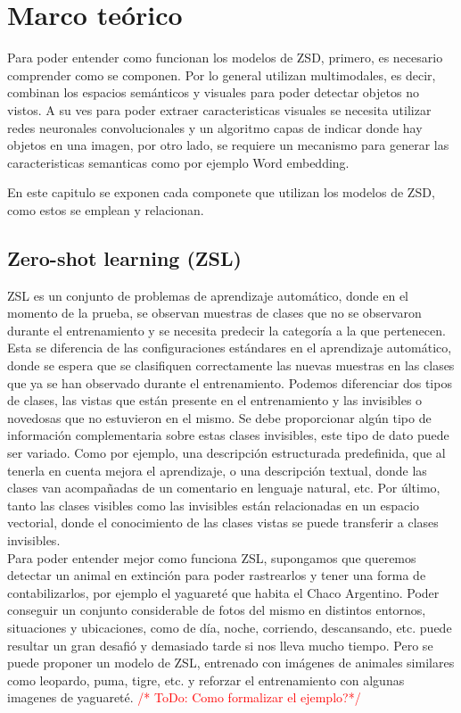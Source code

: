 \chapter{Marco teórico}\label{cap:marcoteorico}

Para poder entender como funcionan los modelos de ZSD, primero, es necesario comprender como se componen. Por lo general utilizan multimodales, es decir, combinan los espacios semánticos y visuales para poder detectar objetos no vistos. A su ves para poder extraer caracteristicas visuales se necesita utilizar redes neuronales convolucionales y un algoritmo capas de indicar donde hay objetos en una imagen, por otro lado, se requiere un mecanismo para generar las caracteristicas semanticas como por ejemplo Word embedding.

En este capitulo se exponen cada componete que utilizan los modelos de ZSD, como estos se emplean y relacionan.

\section {Zero-shot learning (ZSL)} \label{sec:zeroshotlearning}
ZSL es un conjunto de problemas de aprendizaje automático, donde en el momento de la prueba, se observan muestras de clases que no se observaron durante el entrenamiento y se necesita predecir la categoría a la que pertenecen. Esta se diferencia de las configuraciones estándares en el aprendizaje automático, donde se espera que se clasifiquen correctamente las nuevas muestras en las clases que ya se han observado durante el entrenamiento.
Podemos diferenciar dos tipos de clases, las vistas que están presente en el entrenamiento y las invisibles o novedosas que no estuvieron en el mismo. Se debe proporcionar algún tipo de información complementaria sobre estas clases invisibles, este tipo de dato puede ser variado. Como por ejemplo, una descripción estructurada predefinida, que al tenerla en cuenta mejora el aprendizaje, o una descripción textual, donde las clases van acompañadas de un comentario en lenguaje natural, etc. Por último, tanto las clases visibles como las invisibles están relacionadas en un espacio vectorial, donde el conocimiento de las clases vistas se puede transferir a clases invisibles.\\

Para poder entender mejor como funciona ZSL, supongamos que queremos detectar un animal en extinción para poder rastrearlos y tener una forma de contabilizarlos, por ejemplo el yaguareté que habita el Chaco Argentino. Poder conseguir un conjunto considerable de fotos del mismo en distintos entornos, situaciones y ubicaciones, como de día, noche, corriendo, descansando, etc. puede resultar un gran desafió y demasiado tarde si nos lleva mucho tiempo. Pero se puede proponer un modelo de ZSL, entrenado con  imágenes de animales similares como leopardo, puma, tigre, etc. y reforzar el entrenamiento con algunas imagenes de yaguareté. \textcolor{red}{/* ToDo: Como formalizar el ejemplo?*/}\\


